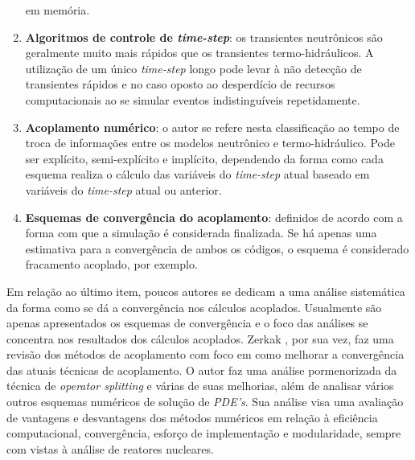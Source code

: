\begin{enumerate}
em memória. 
\item \textbf{Algoritmos de controle de \textit{time-step}}: os transientes neutrônicos são geralmente muito mais rápidos que 
os transientes termo-hidráulicos. A utilização de um único \textit{time-step} longo pode levar à não detecção de transientes 
rápidos e no caso oposto ao desperdício de recursos computacionais ao se simular eventos indistinguíveis repetidamente.
\item \textbf{Acoplamento numérico}: o autor se refere nesta classificação ao tempo de troca de informações entre os modelos 
neutrônico e termo-hidráulico. Pode ser explícito, semi-explícito e implícito, dependendo da forma como cada esquema 
realiza o cálculo das variáveis do \textit{time-step} atual baseado em variáveis do \textit{time-step} atual ou 
anterior.
\item \textbf{Esquemas de convergência do acoplamento}: definidos de acordo com a forma com que a simulação é considerada 
finalizada. Se há apenas uma estimativa para a convergência de ambos os códigos, o esquema é considerado fracamento 
acoplado, por exemplo.  
\end{enumerate}

Em relação ao último item, poucos autores se dedicam a uma análise sistemática da forma como se
dá a convergência nos cálculos acoplados. Usualmente são apenas apresentados os esquemas
de convergência e o foco das análises se concentra nos resultados dos cálculos acoplados.
Zerkak \cite{Zerkak2015}, por sua vez, faz uma revisão dos métodos de acoplamento com
foco em como melhorar a convergência das atuais técnicas de acoplamento. O autor faz uma
análise pormenorizada da técnica de \textit{operator splitting} e várias de suas melhorias,
além de analisar vários outros esquemas numéricos de solução de \textit{PDE's}. Sua análise visa
uma avaliação de vantagens e desvantagens dos métodos numéricos em relação à eficiência
computacional, convergência, esforço de implementação e modularidade, sempre com vistas
à análise de reatores nucleares.

